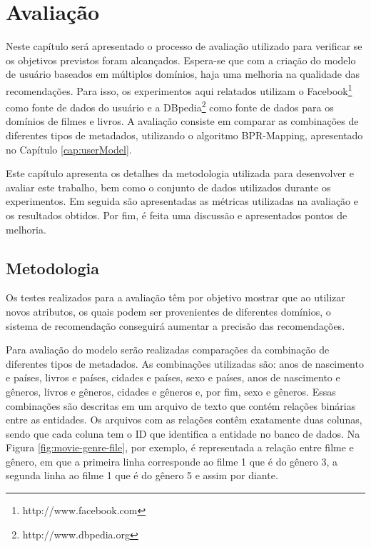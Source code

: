 \chapter{Avaliação}
\label{cap:avaliacao}

Neste capítulo será apresentado o processo de avaliação utilizado para verificar se os objetivos previstos foram alcançados. Espera-se que com a criação do modelo de usuário baseados em múltiplos domínios, haja uma melhoria na qualidade das recomendações. Para isso, os experimentos aqui relatados utilizam o Facebook\footnote{http://www.facebook.com} como fonte de dados do usuário e a DBpedia\footnote{http://www.dbpedia.org} como fonte de dados para os domínios de filmes e livros. A avaliação consiste em comparar as combinações de diferentes tipos de metadados, utilizando o algoritmo BPR-Mapping, apresentado no Capítulo \ref{cap:userModel}.

Este capítulo apresenta os detalhes da metodologia utilizada para desenvolver e avaliar este trabalho, bem como o conjunto de dados utilizados durante os experimentos. Em seguida são apresentadas as métricas utilizadas na avaliação e os resultados obtidos. Por fim, é feita uma discussão e apresentados pontos de melhoria.


\section{Metodologia}


Os testes realizados para a avaliação têm por objetivo mostrar que ao utilizar novos atributos, os quais podem ser provenientes de diferentes domínios, o sistema de recomendação conseguirá aumentar a precisão das recomendações.

Para avaliação do modelo serão realizadas comparações da combinação de diferentes tipos de metadados. As combinações utilizadas são: anos de nascimento e países, livros e países, cidades e países, sexo e países, anos de nascimento e gêneros, livros e gêneros, cidades e gêneros e, por fim, sexo e gêneros. Essas combinações são descritas em um arquivo de texto que contém relações binárias entre as entidades. Os arquivos com as relações contêm exatamente duas colunas, sendo que cada coluna tem o ID que identifica a entidade no banco de dados. Na Figura \ref{fig:movie-genre-file}, por exemplo, é representada a relação entre filme e gênero, em que a primeira linha corresponde ao filme 1 que é do gênero 3, a segunda linha ao filme 1 que é do gênero 5 e assim por diante.

